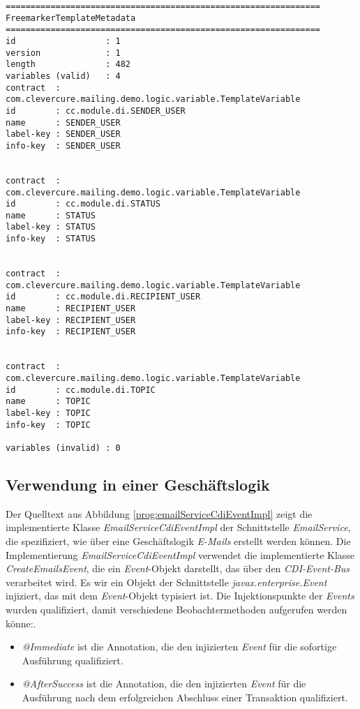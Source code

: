 \begingroup
    \fontsize{9pt}{11pt}\selectfont
    \begin{verbatim}  
===============================================================
FreemarkerTemplateMetadata
===============================================================
id                  : 1
version             : 1
length              : 482
variables (valid)   : 4
contract  : com.clevercure.mailing.demo.logic.variable.TemplateVariable
id        : cc.module.di.SENDER_USER
name      : SENDER_USER
label-key : SENDER_USER
info-key  : SENDER_USER


contract  : com.clevercure.mailing.demo.logic.variable.TemplateVariable
id        : cc.module.di.STATUS
name      : STATUS
label-key : STATUS
info-key  : STATUS


contract  : com.clevercure.mailing.demo.logic.variable.TemplateVariable
id        : cc.module.di.RECIPIENT_USER
name      : RECIPIENT_USER
label-key : RECIPIENT_USER
info-key  : RECIPIENT_USER


contract  : com.clevercure.mailing.demo.logic.variable.TemplateVariable
id        : cc.module.di.TOPIC
name      : TOPIC
label-key : TOPIC
info-key  : TOPIC

variables (invalid) : 0
    \end{verbatim}  
\endgroup

\subsection{Verwendung in einer Geschäftslogik}
Der Quelltext aus Abbildung \ref{prog:emailServiceCdiEventImpl} zeigt die implementierte Klasse \emph{EmailServiceCdiEventImpl} der Schnittstelle \emph{EmailService}, die spezifiziert, wie über eine Geschäftslogik \emph{E-Mails} erstellt werden können. Die Implementierung \emph{EmailServiceCdiEventImpl} verwendet die implementierte Klasse \emph{CreateEmailsEvent}, die ein \emph{Event}-Objekt darstellt, das über den \emph{CDI-Event-Bus} verarbeitet wird. Es wir ein Objekt der Schnittstelle \emph{javax.enterprise.Event} injiziert, das mit dem \emph{Event}-Objekt typisiert ist. Die Injektionspunkte der \emph{Events} wurden qualifiziert, damit verschiedene Beobachtermethoden aufgerufen werden könne:.
\begin{itemize}
	\item\emph{@Immediate}
	\newline
	ist die Annotation, die den injizierten \emph{Event} für die sofortige Ausführung qualifiziert.
	\item\emph{@AfterSuccess}
	\newline
	ist die Annotation, die den injizierten \emph{Event} für die Ausführung nach dem erfolgreichen Abschluss einer Transaktion qualifiziert.
\end{itemize}
\ \newpage


